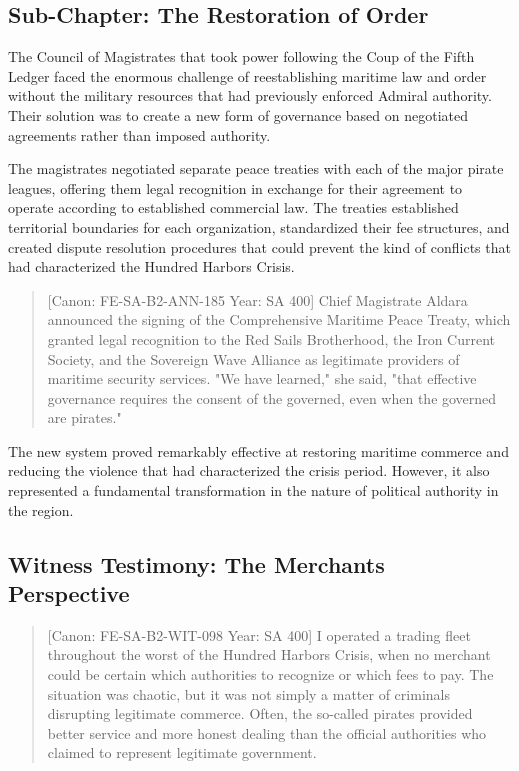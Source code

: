 \subsection{Sub-Chapter: The Restoration of
Order}\label{sub-chapter-the-restoration-of-order}

The Council of Magistrates that took power following the Coup of the
Fifth Ledger faced the enormous challenge of reestablishing maritime law
and order without the military resources that had previously enforced
Admiral authority. Their solution was to create a new form of governance
based on negotiated agreements rather than imposed authority.

The magistrates negotiated separate peace treaties with each of the
major pirate leagues, offering them legal recognition in exchange for
their agreement to operate according to established commercial law. The
treaties established territorial boundaries for each organization,
standardized their fee structures, and created dispute resolution
procedures that could prevent the kind of conflicts that had
characterized the Hundred Harbors Crisis.

\begin{quote}
{[}Canon: FE-SA-B2-ANN-185 \textbar{} Year: SA 400{]} Chief Magistrate
Aldara announced the signing of the Comprehensive Maritime Peace Treaty,
which granted legal recognition to the Red Sails Brotherhood, the Iron
Current Society, and the Sovereign Wave Alliance as legitimate providers
of maritime security services. "We have learned," she said, "that
effective governance requires the consent of the governed, even when the
governed are pirates."
\end{quote}

The new system proved remarkably effective at restoring maritime
commerce and reducing the violence that had characterized the crisis
period. However, it also represented a fundamental transformation in the
nature of political authority in the region.

\subsection{Witness Testimony: The Merchant\textquotesingle s
Perspective}\label{witness-testimony-the-merchants-perspective}

\begin{quote}
{[}Canon: FE-SA-B2-WIT-098 \textbar{} Year: SA 400{]} I operated a
trading fleet throughout the worst of the Hundred Harbors Crisis, when
no merchant could be certain which authorities to recognize or which
fees to pay. The situation was chaotic, but it was not simply a matter
of criminals disrupting legitimate commerce. Often, the so-called
pirates provided better service and more honest dealing than the
official authorities who claimed to represent legitimate government.
\end{quote}


